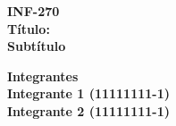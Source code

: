 \centering


{\Huge{\bf INF-270 }}\\
\vspace{3mm}
{\Huge{\bf Título: }}\\
\vspace{3mm}
{\Huge{\bf Subtítulo }}\\
\vspace{3mm}

\vspace{9cm}

\begin{flushleft}
    {\large{\bf Integrantes \\
    \vspace{0.1cm}
    Integrante 1 (11111111-1)\\
    Integrante 2 (11111111-1)\\
    }}
\end{flushleft}
\vfill
